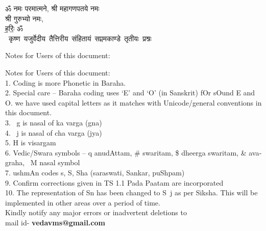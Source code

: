 \begin{titlepage}
    \begin{center}
 
\begin{sanskrit}
    { \Large
    ॐ नमः परमात्मने, श्री महागणपतये नमः\\ 
    श्री गुरुभ्यो नमः,\\
     ह॒रिः॒ ॐ 
    }
    \\
    \vspace{2.5cm}
    \mbox{ \Large
    कृष्ण यजुर्वेदीय तैत्तिरीय संहितायं सप्तमकाण्डे तृतीयः प्रश्नः 
    }
    
\end{sanskrit}
\end{center}

\end{titlepage}

\pagebreak

\begin{english}
    
    
    {
    
        Notes for Users of this document:\newline%
    
        Notes for Users of this document: \\
        1. Coding is more Phonetic in Baraha. \\
        2. Special care – Baraha coding uses ‘E’ and ‘O’ (in Sanskrit) fOr sOund E and O. we have used capital letters as it matches with Unicode/general conventions in this document. \\
        3. ~g is nasal of ka varga (gna) \\
        4. ~j is nasal of cha varga (jya) \\
        5. H is visargam \\
        6.  Vedic/Swara symbols – q anudAttam, \# swaritam, \$ dheerga swaritam, \& avagraha,  ~M nasal symbol \\
        7.  ushmAn codes s, S, Sha (saraswati, Sankar, puShpam) \\
        9. Confirm corrections given in TS 1.1 Pada Paatam are incorporated \\
        10. The representation of Sn has been changed to S~j as per Siksha. This will be implemented in other areas over a period of time. \\
    
    Kindly notify any major errors or inadvertent deletions to \\
    mail id- \textbf{vedavms@gmail.com}
    }
    \end{english}\par
\pagebreak

\tableofcontents

\pagebreak


